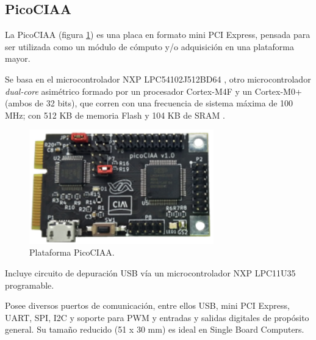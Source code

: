 

\subsection{PicoCIAA}

La PicoCIAA \citep{PicoCIAA} (figura \ref{fig:picoCiaa}) es una placa en formato mini PCI Express, pensada para ser utilizada como un módulo de cómputo y/o adquisición en una plataforma mayor.

Se basa en el microcontrolador NXP LPC54102J512BD64 \citep{LPC54102J512BD64}, otro microcontrolador \emph{dual-core} asimétrico formado por un procesador Cortex-M4F y un Cortex-M0+ (ambos de 32 bits), que corren con una frecuencia de sistema máxima de 100 MHz; con 512 KB de memoria Flash y 104 KB de SRAM .

\begin{figure}[!htbp]
\begin{center}  %
\includegraphics*[width=8cm]{Figures/PicoCIAA_Foto.png}
\par\caption{Plataforma PicoCIAA.}\label{fig:picoCiaa}
\end{center}
\end{figure}

Incluye circuito de depuración USB vía un microcontrolador NXP LPC11U35 \citep{LPC11U35} programable.

Posee diversos puertos de comunicación, entre ellos USB, mini PCI Express, UART, SPI, I2C y soporte para PWM y entradas y salidas digitales de propósito general. Su tamaño reducido (51 x 30 mm) es ideal en Single Board Computers.

